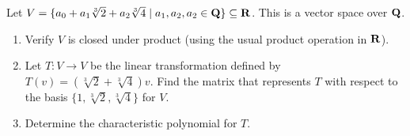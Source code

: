 \documentclass[10pt,twoside,openany]{memoir}
\begin{document}
\begin{problem}[S17, P1]
    Let $V = \{a_0 + a_1 \sqrt[3]{2} + a_2 \sqrt[3]{4} \mid a_1,a_2,a_2 \in \mathbf{Q}\} \subseteq \mathbf{R}$. This is a vector space over $\mathbf{Q}$.
        \begin{enumerate}[label = (\alph*),itemsep=1pt,topsep=3pt]
            \item Verify $V$ is closed under product (using the usual product operation in $\mathbf{R}$).
            \item Let $T:V \rightarrow V$ be the linear transformation defined by $T(v) = (\sqrt[3]{2} + \sqrt[3]{4})v$. Find the matrix that represents $T$ with respect to the basis $\{1, \sqrt[3]{2}, \sqrt[3]{4}\}$ for $V$.
            \item Determine the characteristic polynomial for $T$.
        \end{enumerate}
\end{problem}
\end{document}
